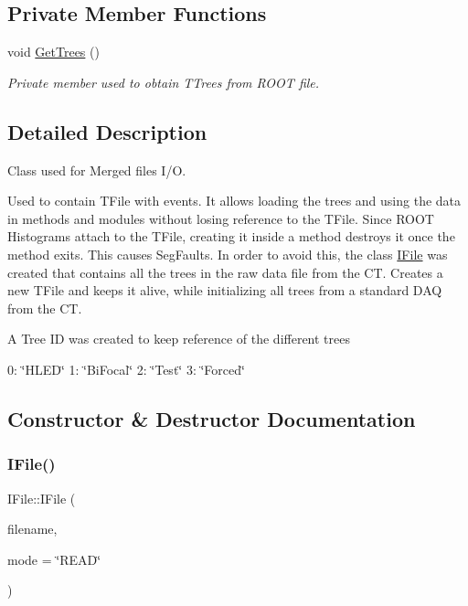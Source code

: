 \subsection*{Private Member Functions}
\begin{DoxyCompactItemize}
\item 
\mbox{\label{classIFile_a78a13dba2a86546e9c85570ae2eafc97}} 
void \hyperlink{classIFile_a78a13dba2a86546e9c85570ae2eafc97}{Get\+Trees} ()
\begin{DoxyCompactList}\small\item\em Private member used to obtain T\+Trees from R\+O\+OT file. \end{DoxyCompactList}\end{DoxyCompactItemize}


\subsection{Detailed Description}
Class used for Merged files I/O. 

Used to contain T\+File with events. It allows loading the trees and using the data in methods and modules without losing reference to the T\+File. Since R\+O\+OT Histograms attach to the T\+File, creating it inside a method destroys it once the method exits. This causes Seg\+Faults. In order to avoid this, the class \hyperlink{classIFile}{I\+File} was created that contains all the trees in the raw data file from the CT. Creates a new T\+File and keeps it alive, while initializing all trees from a standard D\+AQ from the CT.

A Tree ID was created to keep reference of the different trees

0\+: \char`\"{}\+H\+L\+E\+D\char`\"{} 1\+: \char`\"{}\+Bi\+Focal\char`\"{} 2\+: \char`\"{}\+Test\char`\"{} 3\+: \char`\"{}\+Forced\char`\"{} 

\subsection{Constructor \& Destructor Documentation}
\mbox{\label{classIFile_af289b51cd89f7e858cedc3b996883be1}} 
\subsubsection{\texorpdfstring{I\+File()}{IFile()}}
{\footnotesize\ttfamily I\+File\+::\+I\+File (\begin{DoxyParamCaption}\item[{std\+::string}]{filename,  }\item[{std\+::string}]{mode = {\ttfamily \char`\"{}READ\char`\"{}} }\end{DoxyParamCaption})}



